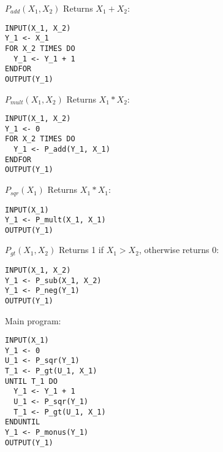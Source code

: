 \documentclass[10pt]{article}
\begin{document}
\begin{enumerate}
  $P_{add}(X_1, X_2)$ Returns $X_1 + X_2$:
  \begin{verbatim}
INPUT(X_1, X_2)
Y_1 <- X_1
FOR X_2 TIMES DO
  Y_1 <- Y_1 + 1
ENDFOR
OUTPUT(Y_1)
  \end{verbatim}

  $P_{mult}(X_1, X_2)$ Returns $X_1 * X_2$:
  \begin{verbatim}
INPUT(X_1, X_2)
Y_1 <- 0
FOR X_2 TIMES DO
  Y_1 <- P_add(Y_1, X_1)
ENDFOR
OUTPUT(Y_1)
  \end{verbatim}

  $P_{sqr}(X_1)$ Returns $X_1 * X_1$:
  \begin{verbatim}
INPUT(X_1)
Y_1 <- P_mult(X_1, X_1)
OUTPUT(Y_1)
  \end{verbatim}

  $P_{gt}(X_1, X_2)$ Returns 1 if $X_1 > X_2$, otherwise returns 0:
  \begin{verbatim}
INPUT(X_1, X_2)
Y_1 <- P_sub(X_1, X_2)
Y_1 <- P_neg(Y_1)
OUTPUT(Y_1)
  \end{verbatim}

  Main program:
\begin{verbatim}
INPUT(X_1)
Y_1 <- 0
U_1 <- P_sqr(Y_1)
T_1 <- P_gt(U_1, X_1)
UNTIL T_1 DO
  Y_1 <- Y_1 + 1
  U_1 <- P_sqr(Y_1)
  T_1 <- P_gt(U_1, X_1)
ENDUNTIL
Y_1 <- P_monus(Y_1)
OUTPUT(Y_1)
  \end{verbatim}

\end{enumerate}
\end{document}
